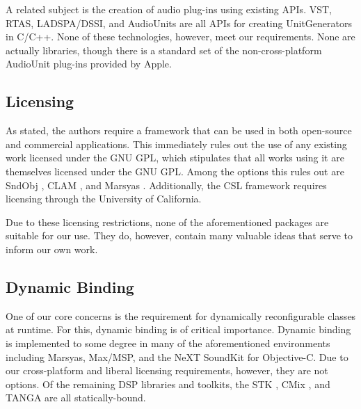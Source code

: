 \documentclass[twoside,10pt]{article}
\begin{document}
A related subject is the creation of audio plug-ins using existing APIs.  VST, RTAS, LADSPA/DSSI, and AudioUnits are all APIs for creating UnitGenerators in C/C++.  None of these technologies, however, meet our requirements.  None are actually libraries, though there is a standard set of the non-cross-platform AudioUnit plug-ins provided by Apple.



\subsection{Licensing} %

As stated, the authors require a framework that can be used in both open-source and commercial applications.  This immediately rules out the use of any existing work licensed under the GNU GPL, which stipulates that all works using it are themselves licensed under the GNU GPL.  Among the options this rules out are SndObj \cite{Lazzarini:2001}, CLAM \cite{Amatraian:2008}, and Marsyas \cite{Tzanetakis:2008}.  Additionally, the CSL framework \cite{Pope:2003} requires licensing through the University of California.%

Due to these licensing restrictions, none of the aforementioned packages are suitable for our use.
They do, however, contain many valuable ideas that serve to inform our own work.



\subsection{Dynamic Binding} %

One of our core concerns is the requirement for dynamically reconfigurable classes at runtime.  For this, dynamic binding is of critical importance.  Dynamic binding is implemented to some degree in many of the aforementioned environments including Marsyas, Max/MSP, and the NeXT SoundKit for Objective-C.  Due to our cross-platform and liberal licensing requirements, however, they are not options.  Of the remaining DSP libraries and toolkits, the STK \cite{Cook:1999}, CMix \cite{Lansky:1990}, and TANGA \cite{Reiter:2007} are all statically-bound.  
\end{document}
